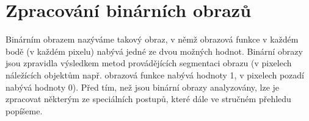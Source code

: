 

\section*{Zpracování binárních obrazů} \label{sec:zpracovani_binarnich_obrazu}

Binárním obrazem nazýváme takový obraz, v němž obrazová funkce v každém bodě (v každém pixelu) nabývá jedné ze dvou možných hodnot. Binární obrazy jsou zpravidla výsledkem metod provádějících segmentaci obrazu (v pixelech náležících objektům např. obrazová funkce nabývá hodnoty 1, v pixelech pozadí nabývá hodnoty 0). Před tím, než jsou binární obrazy analyzovány, lze je zpracovat některým ze speciálních postupů, které dále ve stručném přehledu popíšeme. 

